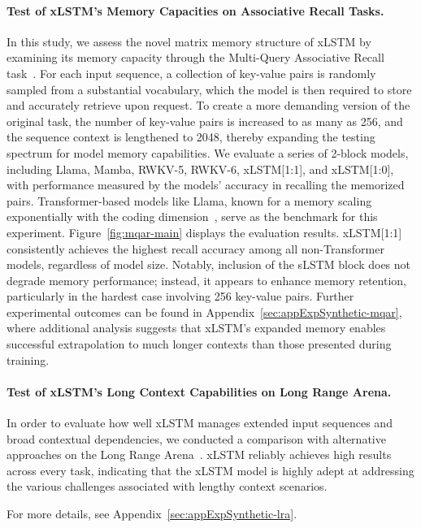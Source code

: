 \paragraph{Test of xLSTM's Memory Capacities on Associative Recall Tasks.} In this study, we assess the novel matrix memory structure of xLSTM by examining its memory capacity through the Multi-Query Associative Recall task~\citep{Arora:23arxiv}. For each input sequence, a collection of key-value pairs is randomly sampled from a substantial vocabulary, which the model is then required to store and accurately retrieve upon request. To create a more demanding version of the original task, the number of key-value pairs is increased to as many as 256, and the sequence context is lengthened to 2048, thereby expanding the testing spectrum for model memory capabilities. We evaluate a series of 2-block models, including Llama, Mamba, RWKV-5, RWKV-6, xLSTM[1:1], and xLSTM[1:0], with performance measured by the models' accuracy in recalling the memorized pairs. Transformer-based models like Llama, known for a memory scaling exponentially with the coding dimension~\citep{Ramsauer:21}, serve as the benchmark for this experiment. Figure~\ref{fig:mqar-main} displays the evaluation results. xLSTM[1:1] consistently achieves the highest recall accuracy among all non-Transformer models, regardless of model size. Notably, inclusion of the sLSTM block does not degrade memory performance; instead, it appears to enhance memory retention, particularly in the hardest case involving 256 key-value pairs. Further experimental outcomes can be found in Appendix~\ref{sec:appExpSynthetic-mqar}, where additional analysis suggests that xLSTM's expanded memory enables successful extrapolation to much longer contexts than those presented during training.

\paragraph{Test of xLSTM's Long Context Capabilities on Long Range Arena.} In order to evaluate how well xLSTM manages extended input sequences and broad contextual dependencies, we conducted a comparison with alternative approaches on the Long Range Arena~\citep{Tay:21}. xLSTM reliably achieves high results across every task, indicating that the xLSTM model is highly adept at addressing the various challenges associated with lengthy context scenarios.

For more details, see Appendix~\ref{sec:appExpSynthetic-lra}.

